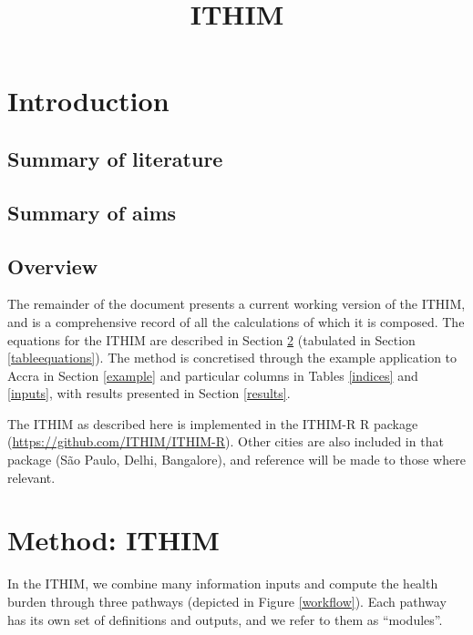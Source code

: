 \documentclass{article}
\title{ITHIM}
\begin{document}
\maketitle
\tableofcontents
\clearpage
\section{Introduction}

\subsection{Summary of literature}

\subsection{Summary of aims}

\subsection{Overview}

The remainder of the document presents a current working version of the ITHIM, and is a comprehensive record of all the calculations of which it is composed. The equations for the ITHIM are described in Section \ref{equations} (tabulated in Section \ref{tableequations}). The method is concretised through the example application to Accra in Section \ref{example} and particular columns in Tables \ref{indices} and \ref{inputs}, with results presented in Section \ref{results}. 

The ITHIM as described here is implemented in the ITHIM-R R package (\url{https://github.com/ITHIM/ITHIM-R}). Other cities are also included in that package (S\~{a}o Paulo, Delhi, Bangalore), and reference will be made to those where relevant.

\section{Method: ITHIM}\label{equations}

In the ITHIM, we combine many information inputs and compute the health burden through three pathways (depicted in Figure \ref{workflow}). Each pathway has its own set of definitions and outputs, and we refer to them as ``modules''.
\end{document}
